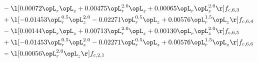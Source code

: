\begin{alignat}{2}
& - \l[  0.00072 \opL_r \opL_z +  0.00475 \opL_r^{2.0} \opL_z +  0.00065 \opL_r \opL_z^{2.0}  \r] f_{c,6,3} \nonumber \\ 
& + \l[  -0.01453 \opL_r^{0.5} \opL_z^{2.0}   -0.02271 \opL_r^{0.5} \opL_z +  0.00576 \opL_r^{1.5} \opL_z  \r] f_{c,6,4} \nonumber \\ 
& - \l[  0.00144 \opL_r \opL_z +  0.00713 \opL_r^{2.0} \opL_z +  0.00130 \opL_r \opL_z^{2.0}  \r] f_{c,6,5} \nonumber \\ 
& + \l[  -0.01453 \opL_r^{0.5} \opL_z^{2.0}   -0.02271 \opL_r^{0.5} \opL_z +  0.00576 \opL_r^{1.5} \opL_z  \r] f_{c,6,6} \nonumber \\ 
& - \l[  0.00056 \opL_r^{2.0} \opL_z  \r] f_{c,2,1} \nonumber \\ 
\end{alignat} 


